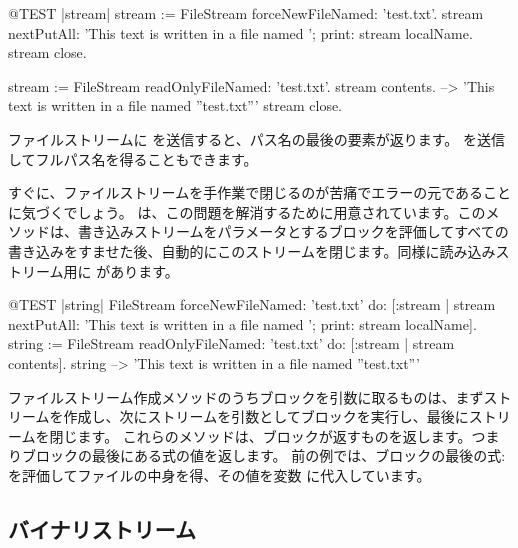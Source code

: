 \documentclass[a4paper,10pt,twoside]{book}
\begin{document}
\begin{code}{@TEST |stream|}
stream := FileStream forceNewFileNamed: 'test.txt'.
stream
    nextPutAll: 'This text is written in a file named ';
    print: stream localName.
stream close.

stream := FileStream readOnlyFileNamed: 'test.txt'.
stream contents. --> 'This text is written in a file named ''test.txt'''
stream close.
\end{code}



ファイルストリームに  を送信すると、パス名の最後の要素が返ります。
 を送信してフルパス名を得ることもできます。

すぐに、ファイルストリームを手作業で閉じるのが苦痛でエラーの元であることに気づくでしょう。
 は、この問題を解消するために用意されています。このメソッドは、書き込みストリームをパラメータとするブロックを評価してすべての書き込みをすませた後、自動的にこのストリームを閉じます。同様に読み込みストリーム用に  があります。%

\begin{code}{@TEST |string|}
FileStream
    forceNewFileNamed: 'test.txt'
    do: [:stream |
        stream
            nextPutAll: 'This text is written in a file named ';
            print: stream localName].
string := FileStream
            readOnlyFileNamed: 'test.txt'
            do: [:stream | stream contents].
string --> 'This text is written in a file named ''test.txt'''
\end{code}

ファイルストリーム作成メソッドのうちブロックを引数に取るものは、まずストリームを作成し、次にストリームを引数としてブロックを実行し、最後にストリームを閉じます。
これらのメソッドは、ブロックが返すものを返します。つまりブロックの最後にある式の値を返します。
前の例では、ブロックの最後の式:  を評価してファイルの中身を得、その値を変数  に代入しています。

\subsection{バイナリストリーム}
\end{document}
